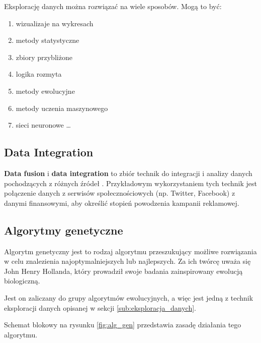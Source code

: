 \documentclass[twocolumn]{svjour3}          %
\begin{document}
Eksplorację danych można rozwiązać na wiele sposobów. Mogą to być:
\begin{enumerate}
    \item wizualizaje na wykresach
    \item metody statystyczne
    \item zbiory przybliżone
    \item logika rozmyta
    \item metody ewolucyjne
    \item metody uczenia maszynowego
    \item sieci neuronowe \ldots
\end{enumerate}

\subsection{Data Integration}
\label{sub:data_integration}
\textbf{Data fusion} i \textbf{data integration} to zbiór technik do integracji i analizy danych pochodzących z różnych źródeł \cite{lenzerini02}. Przykładowym wykorzystaniem tych technik jest połączenie danych z serwisów społecznościowych (np. Twitter, Facebook) z danymi finansowymi, aby określić stopień powodzenia kampanii reklamowej.

\subsection{Algorytmy genetyczne}
\label{sub:algorytmy_genetyczne}
Algorytm genetyczny jest to rodzaj algorytmu przeszukujący możliwe rozwiązania w celu znalezienia najoptymalniejszych lub najlepszych. Za ich twórcę uważa się John Henry Hollanda, który prowadził swoje badania zainspirowany ewolucją biologiczną.

Jest on zaliczany do grupy algorytmów ewolucyjnych, a więc jest jedną z technik eksploracji danych opisanej w sekcji \ref{sub:eksploracja_danych}.

Schemat blokowy na rysunku \ref{fig:alg_gen} przedstawia zasadę działania tego algorytmu.
\end{document}
